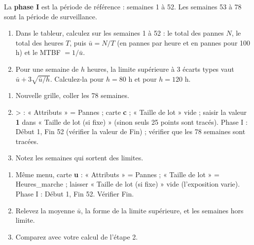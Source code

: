\documentclass[10pt,a4paper]{article}
\begin{document}

La \textbf{phase I} est la période de référence : semaines 1 à 52. Les semaines 53 à 78 sont la période de surveillance.
\begin{enumerate}[label=\textcolor{cyan}{\textbf{\arabic*.}},leftmargin=15pt,itemsep=1.5pt]
\item Dans le tableur, calculez sur les semaines 1 à 52 : le total des pannes $N$, le total des heures $T$, puis $\bar u = N/T$ (en pannes par heure et en pannes pour 100 h) et le MTBF $= 1/\bar u$.
\item Pour une semaine de $h$ heures, la limite supérieure à 3 écarts types vaut $\bar u + 3\sqrt{\bar u / h}$. Calculez-la pour $h = 80$ h et pour $h = 120$ h.
\end{enumerate}

 \tagE
\begin{enumerate}[label=\textcolor{cyan}{\textbf{\arabic*.}},leftmargin=15pt,itemsep=1.5pt]
\item Nouvelle grille, coller les 78 semaines.
\item {} >  : « Attributs » = Pannes ; carte \textbf{c} ; « Taille de lot » vide ; saisir la valeur \textbf{1} dans « Taille de lot (si fixe) » (sinon seuls 25 points sont tracés). Phase I : Début 1, Fin 52 (vérifier la valeur de Fin) ; vérifier que les 78 semaines sont tracées.
\item Notez les semaines qui sortent des limites.
\end{enumerate}

 \tagE
\begin{enumerate}[label=\textcolor{cyan}{\textbf{\arabic*.}},leftmargin=15pt,itemsep=1.5pt]
\item Même menu, carte \textbf{u} : « Attributs » = Pannes ; « Taille de lot » = Heures\_marche ; laisser « Taille de lot (si fixe) » vide (l'exposition varie). Phase I : Début 1, Fin 52. Vérifier Fin.
\item Relevez la moyenne $\bar u$, la forme de la limite supérieure, et les semaines hors limite.
\item Comparez avec votre calcul de l'étape 2.
\end{enumerate}
\end{document}

